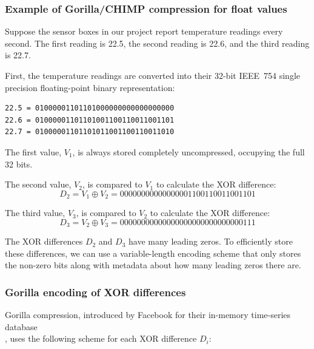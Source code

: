 \subsubsection{Example of Gorilla/CHIMP compression for float values}

Suppose the sensor boxes in our project report temperature readings every
second. The first reading is 22.5, the second reading is 22.6, and the third
reading is 22.7.

First, the temperature readings are converted into their 32-bit IEEE~754 single
precision floating-point binary representation:

\begin{verbatim}
22.5 = 01000001101101000000000000000000
22.6 = 01000001101101001100110011001101
22.7 = 01000001101101011001100110011010
\end{verbatim}

The first value, $V_1$, is always stored completely uncompressed, occupying the
full 32 bits.

The second value, $V_2$, is compared to $V_1$ to calculate the XOR difference:
\[
  D_2 = V_1 \oplus V_2 = 00000000000000001100110011001101
\]

The third value, $V_3$, is compared to $V_2$ to calculate the XOR difference:
\[
  D_3 = V_2 \oplus V_3 = 00000000000000000000000000000111
\]

The XOR differences $D_2$ and $D_3$ have many leading zeros. To efficiently
store these differences, we can use a variable-length encoding scheme that only
stores the non-zero bits along with metadata about how many leading zeros there
are.

\subsubsection*{Gorilla encoding of XOR differences}

Gorilla compression, introduced by Facebook for their in-memory time-series
database\\\cite{Gorilla:01}, uses the following scheme for each XOR difference
$D_i$:

